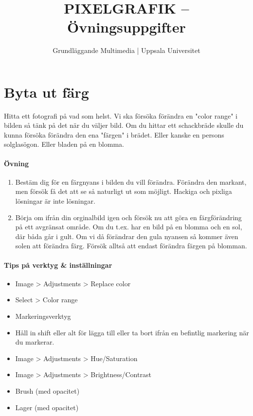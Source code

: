 \documentclass{article}
\begin{document}
  \title{ PIXELGRAFIK -- Övningsuppgifter }
  \author{ Grundläggande Multimedia | Uppsala Universitet }
  \date{}
  \maketitle

  \section{Byta ut färg}
    \paragraph{}
    Hitta ett fotografi på vad som helst. Vi ska försöka förändra en "color range" i bilden så tänk på det när du väljer bild. Om du hittar ett schackbräde skulle du kunna försöka förändra den ena "färgen" i brädet. Eller kanske en persons solglasögon. Eller bladen på en blomma.

    \paragraph{Övning}
      \begin{enumerate}
        \item Bestäm dig för en färgnyans i bilden du vill förändra. Förändra den markant, men försök få det att se så naturligt ut som möjligt. Hackiga och pixliga lösningar är inte lösningar.
        \item Börja om ifrån din orginalbild igen och försök nu att göra en färgförändring på ett avgränsat område. Om du t.ex. har en bild på en blomma och en sol, där båda går i gult. Om vi då förändrar den gula nyansen så kommer även solen att förändra färg. Försök alltså att endast förändra färgen på blomman.
      \end{enumerate} 

    \paragraph{Tips på verktyg \& inställningar}
      \begin{itemize}
        \item Image > Adjustments > Replace color
        \item Select > Color range
        \item Markeringsverktyg
        \item Håll in shift eller alt för lägga till eller ta bort ifrån en befintlig markering när du markerar.
        \item Image > Adjustments > Hue/Saturation
        \item Image > Adjustments > Brightness/Contrast
        \item Brush (med opacitet)
        \item Lager (med opacitet)
      \end{itemize}
\end{document}
